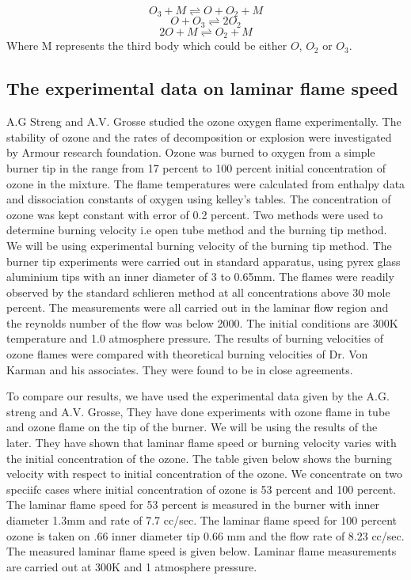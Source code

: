 			$$O_3 + M \rightleftharpoons O + O_2 + M $$
			$$ O + O_3 \rightleftharpoons  2O_2$$ 
			$$ 2O + M \rightleftharpoons O_2 + M$$
\noindent Where M represents the third body which could be either $O$, $O_2$ or $O_3$. 


\subsection{The experimental data on laminar flame speed}

\noindent A.G Streng and A.V. Grosse\cite{Streng}  studied the ozone oxygen flame experimentally. The stability of ozone and the rates of decomposition or explosion were investigated by Armour research foundation. Ozone was burned to oxygen from a simple burner tip in the range from 17 percent to 100 percent initial concentration of ozone in the mixture. The flame temperatures were calculated from enthalpy data and dissociation constants of oxygen using kelley's tables. The concentration of ozone was kept constant with error of   0.2 percent. Two methods were used to determine burning velocity i.e open tube method and the burning tip method. We will be using experimental burning velocity of the burning tip method. The burner tip experiments were carried out in standard apparatus, using pyrex glass aluminium tips with an inner diameter of 3 to 0.65mm. The flames were readily observed by the standard schlieren method at all concentrations above 30 mole percent. The measurements were all carried out in the laminar flow region and the reynolds number of the flow was below 2000. The initial conditions are 300K temperature and 1.0 atmosphere pressure. The results of burning velocities of ozone flames were compared with theoretical burning velocities of Dr. Von Karman and his associates. They were found to be in close agreements. 


\noindent To compare our results, we have used the experimental data given by the A.G.  streng\cite{Streng} and A.V. Grosse, They have done experiments with ozone flame in tube and ozone flame on the tip of the burner. We will be using the results of the later. They have shown that laminar flame speed or burning velocity varies with the initial concentration of the ozone. The table given below shows the burning velocity with respect to initial concentration of the ozone. We concentrate on two speciifc cases where initial concentration of ozone is 53 percent and 100 percent. The laminar flame speed for 53 percent is measured in the burner with inner diameter 1.3mm  and rate of 7.7 cc/sec. The laminar flame speed for 100 percent ozone is taken on .66 inner diameter tip 0.66 mm and the flow rate of 8.23 cc/sec. 
The measured laminar flame speed is given below. Laminar flame measurements are carried out at 300K and 1 atmosphere pressure. 

